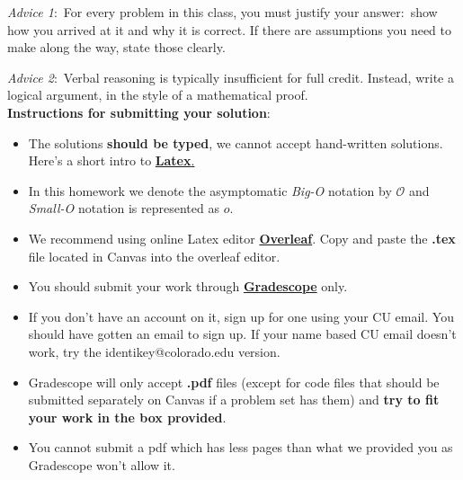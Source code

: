 \documentclass[12pt]{article}
\begin{document}
\renewcommand{\headrulewidth}{0.5pt}

\phantom{Test}

\begin{small}
\textit{Advice 1}:\ For every problem in this class, you must justify your answer:\ show how you arrived at it and why it is correct. If there are assumptions you need to make along the way, state those clearly.

\textit{Advice 2}:\ Verbal reasoning is typically insufficient for full credit. Instead, write a logical argument, in the style of a mathematical proof.\\

\textbf{Instructions for submitting your solution}:
\vspace{-5mm} 

\begin{itemize}
	\item The solutions \textbf{should be typed}, we cannot accept hand-written solutions. Here's a short intro to \href{http://ece.uprm.edu/~caceros/latex/introduction.pdf}{\textbf{Latex}.}
	 \item In this homework we denote the asymptomatic \textit{Big-O} notation by $\mathcal{O}$ and \textit{Small-O} notation is represented as $o$. 
	\item We recommend using online Latex editor \href{https://www.overleaf.com/}{\textbf{Overleaf}}. Copy and paste the \textbf{.tex} file located in Canvas into the overleaf editor.
	\item You should submit your work through \href{https://www.gradescope.com}{\textbf{Gradescope}}  only.
	\item If you don't have an account on it, sign up for one using your CU email. You should have gotten an email to sign up. If your name based CU email doesn't work, try the identikey@colorado.edu version. 
	\item Gradescope will only accept \textbf{.pdf} files (except for code files that should be submitted separately on Canvas if a problem set has them) and \textbf{try to fit your work in the box provided}. 
	\item You cannot submit a pdf which has less pages than what we provided you as Gradescope won't allow it.
   
\end{itemize}
\vspace{-4mm} 
\end{small}
\end{document}
